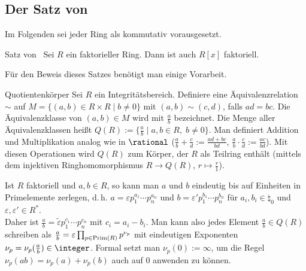 \subsection{%
    Der Satz von %
}

\begin{Bem}
    Im Folgenden sei jeder Ring als kommutativ vorausgesetzt.
\end{Bem}

\begin{Theorem}{Satz von \upshape\,\!}
    Sei $R$ ein faktorieller Ring.
    Dann ist auch $R[x]$ faktoriell.
\end{Theorem}

\linie

\begin{Bem}
    Für den Beweis dieses Satzes benötigt man einige Vorarbeit.
\end{Bem}

\begin{Def}{Quotientenkörper}
    Sei $R$ ein Integritätsbereich.
    Definiere eine Äquivalenzrelation $\sim$ auf
    $M = \{(a, b) \in R \times R \;|\; b \not= 0\}$ mit
    $(a, b) \sim (c, d)$, falls $ad = bc$.
    Die Äquivalenzklasse von $(a, b) \in M$ wird mit $\frac{a}{b}$
    bezeichnet.
    Die Menge aller Äquivalenzklassen heißt 
    $Q(R) := \{\frac{a}{b} \;|\; a, b \in R,\; b \not= 0\}$.
    Man definiert Addition und Multiplikation analog wie in $\rational$
    ($\frac{a}{b} + \frac{c}{d} := \frac{ad + bc}{bd}$,
    $\frac{a}{b} \cdot \frac{c}{d} := \frac{ac}{bd}$).
    Mit diesen Operationen wird $Q(R)$ zum Körper, der $R$ als Teilring
    enthält (mittels dem injektiven Ringhomomorphismus
    $R \rightarrow Q(R)$, $r \mapsto \frac{r}{1}$).
\end{Def}

\begin{Bem}
    Ist $R$ faktoriell und $a, b \in R$, so kann man $a$ und $b$ eindeutig
    bis auf Einheiten in Primelemente zerlegen, d.\,h.
    $a = \varepsilon p_1^{a_1} \dotsm p_n^{a_n}$ und
    $b = \varepsilon' p_1^{b_1} \dotsm p_n^{b_n}$
    für $a_i, b_i \in \natural_0$ und $\varepsilon, \varepsilon' \in R^\ast$.\\
    Daher ist
    $\frac{a}{b} = \widetilde{\varepsilon} p_1^{c_1} \dotsm p_n^{c_n}$
    mit $c_i = a_i - b_i$.
    Man kann also jedes Element $\frac{a}{b} \in Q(R)$ schreiben als
    $\frac{a}{b} = \varepsilon \prod_{p \in \operatorname{Prim}(R)} p^{\nu_p}$ mit
    eindeutigen Exponenten $\nu_p = \nu_p(\frac{a}{b}) \in \integer$.
    Formal setzt man $\nu_p(0) := \infty$, um die Regel
    $\nu_p(ab) = \nu_p(a) + \nu_p(b)$ auch auf $0$ anwenden zu können.
\end{Bem}

